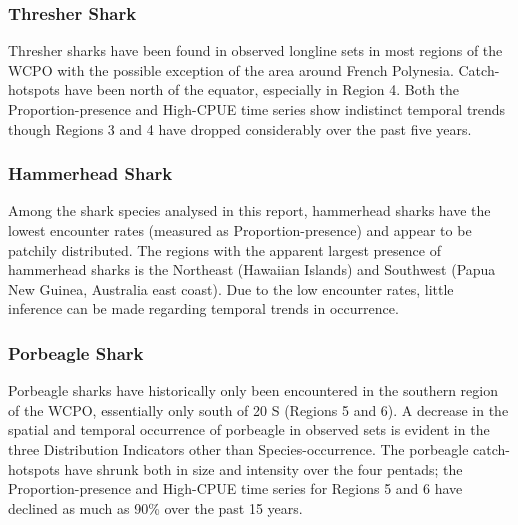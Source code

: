 \documentclass[12pt]{SCreport}
\begin{document}
 \subsubsection{Thresher Shark}
 Thresher sharks have been found in observed longline sets in most regions of the WCPO with the possible exception of the area around French Polynesia. Catch-hotspots have been north of the equator, especially in Region 4. Both the Proportion-presence and High-CPUE time series show indistinct temporal trends though Regions 3 and 4 have dropped considerably over the past five years.

 \subsubsection{Hammerhead Shark}
 Among the shark species analysed in this report, hammerhead sharks have the lowest encounter rates (measured as Proportion-presence) and appear to be patchily distributed.  The regions with the apparent largest presence of hammerhead sharks is the Northeast (Hawaiian Islands) and Southwest (Papua New Guinea, Australia east coast).  Due to the low encounter rates, little inference can be made regarding temporal trends in occurrence.
 
         
 \subsubsection{Porbeagle Shark}
 Porbeagle sharks have historically only been encountered in the southern region of the WCPO, essentially only south of 20 \degree S (Regions 5 and 6).  A decrease in the spatial and temporal occurrence of porbeagle in observed sets is evident in the three Distribution Indicators other than Species-occurrence.  The porbeagle catch-hotspots have shrunk both in size and intensity over the four pentads; the Proportion-presence and High-CPUE time series for Regions 5 and 6 have declined as much as 90\% over the past 15 years.
 
\end{document}
